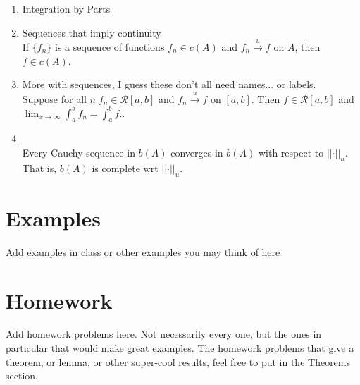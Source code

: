 \documentclass{article}
\newcommand{\norm}[1]{\left|\left|#1\right|\right|}
\newcommand{\scriptR}{\mathcal{R}}
\begin{document}
\begin{enumerate}
    \item Integration by Parts\label{intbyparts}\hfill \\

    \item Sequences that imply continuity\label{seqimpc}\hfill \\
        If \(\{f_n\}\) is a sequence of functions \(f_n\in c(A)\) and \(f_n\stackrel{u}{\to} f\) on \(A\), then \(f\in c(A)\).

    \item More with sequences,  I guess these don't all need names... or labels.\hfill \\
        Suppose for all \(n\; f_n\in\scriptR[a,b]\) and \(f_n\stackrel{u}{\to} f\) on \([a,b]\).  Then \(f\in\scriptR[a,b]\) and \(\displaystyle{\lim_{x\to\infty}\int_a^bf_n = \int_a^b f.}\).

    \item \hfill \\
        Every Cauchy sequence in \(b(A)\) converges in \(b(A)\) with respect to \(\norm{\cdot}_u\).  
        That is, \(b(A)\) is complete wrt \(\norm{\cdot}_u.\)

\end{enumerate}




\section{Examples}
Add examples in class or other examples you may think of here

\section{Homework}
Add homework problems here.  Not necessarily every one, but the ones in particular that would make great examples.
The homework problems that give a theorem, or lemma, or other super-cool results, feel free to put in the Theorems section.
\end{document}
